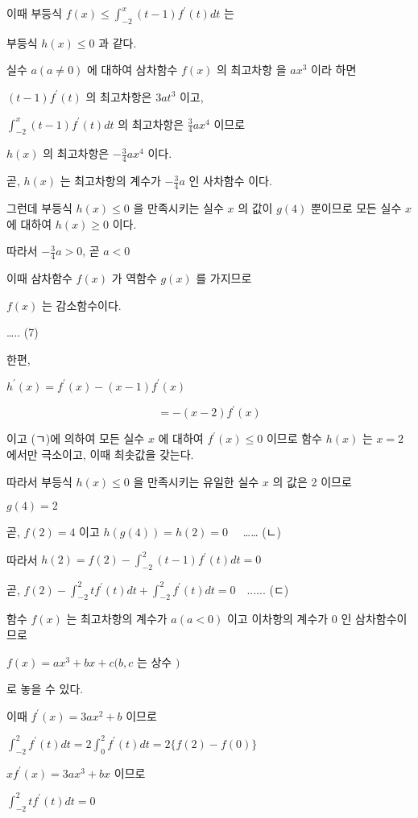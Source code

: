 \documentclass[10pt]{article}
\begin{document}
이때 부등식 $f(x) \leq \int_{-2}^{x}(t-1) f^{\prime}(t) d t$ 는

부등식 $h(x) \leq 0$ 과 같다.

실수 $a(a \neq 0)$ 에 대하여 삼차함수 $f(x)$ 의 최고차항 을 $a x^{3}$ 이라 하면

$(t-1) f^{\prime}(t)$ 의 최고차항은 $3 a t^{3}$ 이고,

$\int_{-2}^{x}(t-1) f^{\prime}(t) d t$ 의 최고차항은 $\frac{3}{4} a x^{4}$ 이므로

$h(x)$ 의 최고차항은 $-\frac{3}{4} a x^{4}$ 이다.

곧, $h(x)$ 는 최고차항의 계수가 $-\frac{3}{4} a$ 인 사차함수 이다.

그런데 부등식 $h(x) \leq 0$ 을 만족시키는 실수 $x$ 의 값이 $g(4)$ 뿐이므로 모든 실수 $x$ 에 대하여 $h(x) \geq 0$ 이다.

따라서 $-\frac{3}{4} a>0$, 곧 $a<0$

이때 삼차함수 $f(x)$ 가 역함수 $g(x)$ 를 가지므로

$f(x)$ 는 감소함수이다.

….. (7)

한편,

$h^{\prime}(x)=f^{\prime}(x)-(x-1) f^{\prime}(x)$

\[
=-(x-2) f^{\prime}(x)
\]

이고 (ㄱ)에 의하여 모든 실수 $x$ 에 대하여 $f^{\prime}(x) \leq 0$ 이므로 함수 $h(x)$ 는 $x=2$ 에서만 극소이고, 이때 최솟값을 갖는다.

따라서 부등식 $h(x) \leq 0$ 을 만족시키는 유일한 실수 $x$ 의 값은 2 이므로

$g(4)=2$

곧, $f(2)=4$ 이고 $h(g(4))=h(2)=0 \quad$ …… (ㄴ)

따라서 $h(2)=f(2)-\int_{-2}^{2}(t-1) f^{\prime}(t) d t=0$

곧, $f(2)-\int_{-2}^{2} t f^{\prime}(t) d t+\int_{-2}^{2} f^{\prime}(t) d t=0 \quad$...... (ㄷ)

함수 $f(x)$ 는 최고차항의 계수가 $a(a<0)$ 이고 이차항의 계수가 0 인 삼차함수이므로

$f(x)=a x^{3}+b x+c(b, c$ 는 상수 $)$

로 놓을 수 있다.

이때 $f^{\prime}(x)=3 a x^{2}+b$ 이므로

$\int_{-2}^{2} f^{\prime}(t) d t=2 \int_{0}^{2} f^{\prime}(t) d t=2\{f(2)-f(0)\}$

$x f^{\prime}(x)=3 a x^{3}+b x$ 이므로

$\int_{-2}^{2} t f^{\prime}(t) d t=0$
\end{document}

